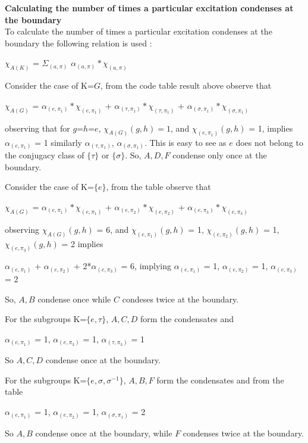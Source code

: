 \textbf{Calculating the number of times a particular excitation condenses at the boundary} \\
To calculate the number of times a particular excitation condenses at the boundary the following relation is used \citep{Reference1}:
\begin{center}
$\chi_{A(K)}$ = $\varSigma_{(a, \pi)}$ $\alpha_{(a, \pi)}*\chi_{(a, \pi)}$
\end{center}

Consider the case of K=$G$, from the code table result above observe that
\begin{center}
$\chi_{A(G)}$ = $\alpha_{(e, \pi_{1})}*\chi_{(e, \pi_{1})}$ + $\alpha_{(\tau, \pi_{1})}*\chi_{(\tau, \pi_{1})}$ + $\alpha_{(\sigma, \pi_{1})}*\chi_{(\sigma, \pi_{1})}$
\end{center}
observing that for $g$=$h$=$e$, $\chi_{A(G)}(g,h) = 1$, and $\chi_{(e, \pi_{1})}(g, h)$ = 1, implies $\alpha_{(e, \pi_{1})}$ = 1 similarly 
$\alpha_{(\tau, \pi_{1})}$, $\alpha_{(\sigma, \pi_{1})}$.  This is easy to see as $e$ does not belong to the conjugacy class of $\{\tau\}$ or $\{\sigma\}$.
So, $A, D, F$ condense only once at the boundary.

Consider the case of K=$\{e\}$, from the table observe that
\begin{center}
$\chi_{A(G)}$ = $\alpha_{(e, \pi_{1})}*\chi_{(e, \pi_{1})}$ + $\alpha_{(e, \pi_{2})}*\chi_{(e, \pi_{2})}$ + $\alpha_{(e, \pi_{3})}*\chi_{(e, \pi_{3})}$
\end{center}
observing $\chi_{A(G)}(g,h)$ = 6, and $\chi_{(e, \pi_{1})}(g, h)$ = 1, $\chi_{(e, \pi_{2})}(g, h)$ = 1, $\chi_{(e, \pi_{3})}(g, h)$ = 2 implies 
\begin{center}
$\alpha_{(e, \pi_{1})}$ + $\alpha_{(e, \pi_{2})}$ + 2*$\alpha_{(e, \pi_{3})}$ = 6, implying
$\alpha_{(e, \pi_{1})}$ = 1, $\alpha_{(e, \pi_{2})}$ = 1, $\alpha_{(e, \pi_{3})}$ = 2
\end{center}
So, $A,B$ condense once while $C$ condeses twice at the boundary.

For the subgroups K=$\{e, \tau\}$, $A,C,D$ form the condensates and   
\begin{center}
$\alpha_{(e, \pi_{1})}$ = 1, $\alpha_{(e, \pi_{3})}$ = 1, $\alpha_{(\tau, \pi_{3})}$ = 1
\end{center}
So $A, C, D$ condense once at the boundary.

For the subgroups K=$\{e, \sigma, \sigma^{-1}\}$, $A, B, F$ form the condensates and from the table    
\begin{center}
$\alpha_{(e, \pi_{1})}$ = 1, $\alpha_{(e, \pi_{2})}$ = 1, $\alpha_{(\sigma, \pi_{1})}$ = 2
\end{center}
So $A, B$ condense once at the boundary, while $F$ condenses  twice at the boundary.


